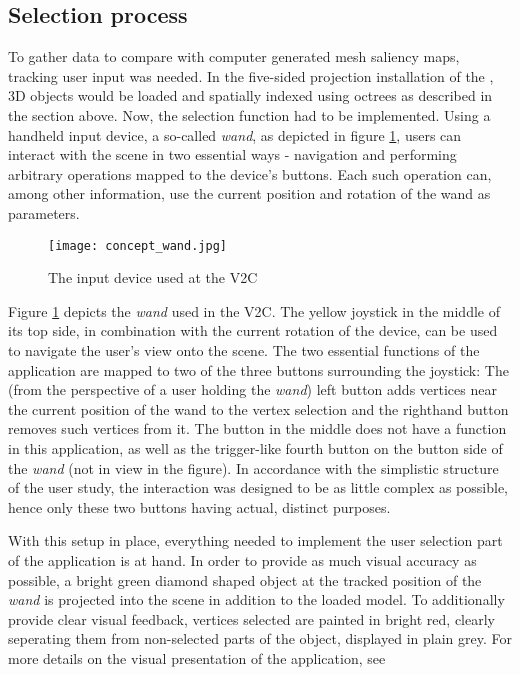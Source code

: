 		\subsection{Selection process}
		\label{sec:selection_process}

To gather data to compare with computer generated mesh saliency maps, tracking user input was needed. In the five-sided projection installation of the \cite{v2c}, 3D objects would be loaded and spatially indexed using octrees as described in the section above. Now, the selection function had to be implemented. Using a handheld input device, a so-called \textit{wand}, as depicted in figure \ref{fig:wand}, users can interact with the scene in two essential ways - navigation and performing arbitrary operations mapped to the device's buttons. Each such operation can, among other information, use the current position and rotation of the wand as parameters.

\begin{figure}[htb]
  \centering
  \texttt{[image: concept\_wand.jpg]}\\ %
  \caption{The input device used at the V2C}\label{fig:wand}
\end{figure}

Figure \ref{fig:wand} depicts the \textit{wand} used in the V2C. The yellow joystick in the middle of its top side, in combination with the current rotation of the device, can be used to navigate the user's view onto the 
scene. The two essential functions of the application are mapped to two of the three buttons surrounding the joystick: The (from the perspective of a user holding the \textit{wand}) left button adds vertices near the current position of the wand to the vertex selection and the righthand button removes such vertices from it. The button in the middle does not have a function in this application, as well as the trigger-like fourth button on the button side of the \textit{wand} (not in view in the figure).
In accordance with the simplistic structure of the user study, the interaction was designed to be as little complex as possible, hence only these two buttons having actual, distinct purposes. 

With this setup in place, everything needed to implement the user selection part of the application is at hand. In order to provide as much visual accuracy as possible, a bright green diamond shaped object at the tracked position of the \textit{wand} is projected into the scene in addition to the loaded model. To additionally provide clear visual feedback, vertices selected are painted in bright red, clearly seperating them from non-selected parts of the object, displayed in plain grey. For more details on the visual presentation of the application, see 

